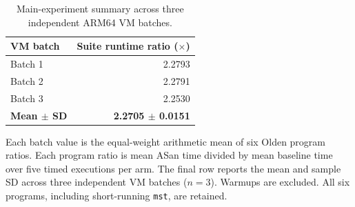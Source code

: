 \begin{table}[t]
\centering
\caption{Main-experiment summary across three independent ARM64 VM batches.}
\label{tab:main-batch-summary}
\begin{tabular}{lr}
\toprule
VM batch & Suite runtime ratio ($\times$) \\
\midrule
Batch 1 & 2.2793 \\
Batch 2 & 2.2791 \\
Batch 3 & 2.2530 \\
\addlinespace
\textbf{Mean $\pm$ SD} & \textbf{2.2705 $\pm$ 0.0151} \\
\bottomrule
\end{tabular}
\par\smallskip\begin{minipage}{0.95\linewidth}\footnotesize
Each batch value is the equal-weight arithmetic mean of six Olden program ratios. Each program ratio is mean ASan time divided by mean baseline time over five timed executions per arm. The final row reports the mean and sample SD across three independent VM batches ($n=3$). Warmups are excluded. All six programs, including short-running \texttt{mst}, are retained.
\end{minipage}
\end{table}
